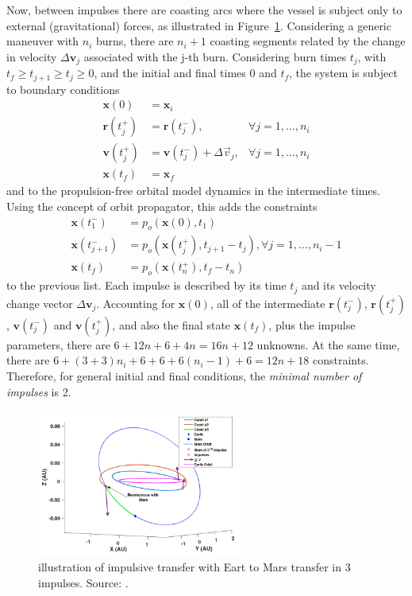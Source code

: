Now, between impulses there are coasting arcs where the vessel is subject only to external (gravitational) forces, as illustrated in Figure~\ref{fig:impulsive_maneuver_diagram}. Considering a generic maneuver with \(n_i\) burns, there are \(n_i+1\) coasting segments related by the change in velocity \(\Delta \mathbf{v}_j\) associated with the j-th burn. Considering burn times \(t_j\), with \(t_f \geq t_{j+1} \geq t_j \geq 0\), and the initial and final times \(0\) and \(t_f\), the system is subject to boundary conditions
\begin{align}
    \mathbf{x}(0) &= \mathbf{x}_i \\
    \mathbf{r}(t_j^+) &= \mathbf{r}(t_j^-),& \forall j=1,\dots,n_i \\
    \mathbf{v}(t_j^+) &= \mathbf{v}(t_j^-) + \Delta \vec v_j,& \forall j=1,\dots,n_i \\
    \mathbf{x}(t_f) &= \mathbf{x}_f
\end{align}
and to the propulsion-free orbital model dynamics in the intermediate times. Using the concept of orbit propagator, this adds the constraints
\begin{align}
    \mathbf{x}(t_1^-) &= p_o(\mathbf{x}(0), t_1) \\
    \mathbf{x}(t_{j+1}^-) &= p_o(\mathbf{x}(t_j^+), t_{j+1} - t_j), \forall j = 1, \dots, n_i-1 \\
    \mathbf{x}(t_f) &= p_o(\mathbf{x}(t_n^+), t_f - t_n)
\end{align}
to the previous list. Each impulse is described by its time \(t_j\) and its velocity change vector \(\Delta \mathbf{v}_j\). Accounting for \(\mathbf{x}(0)\), all of the intermediate \(\mathbf{r}(t_j^-)\), \(\mathbf{r}(t_j^+)\), \(\mathbf{v}(t_j^-)\) and \(\mathbf{v}(t_j^+)\), and also the final state \(\mathbf{x}(t_f)\), plus the impulse parameters, there are \(6 + 12n + 6 + 4n = 16n + 12\) unknowns. At the same time, there are \(6 + (3 + 3)n_i + 6 + 6 + 6(n_i-1) + 6 = 12n + 18\) constraints. Therefore, for general initial and final conditions, the \textit{minimal number of impulses} is 2. 

\begin{figure}[htbp]
    \centering
    \includegraphics[width=0.6\textwidth]{img/impulsive_traj_from_how_many_impulses.png}
    \caption{illustration of impulsive transfer with Eart to Mars transfer in 3 impulses. Source: \cite{how_many_impulses}.}
    \label{fig:impulsive_maneuver_diagram}
\end{figure}

